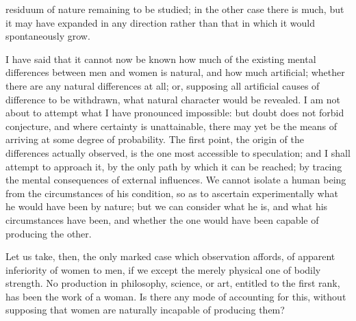 \documentclass[12pt]{report}
\begin{document}
residuum of nature remaining to be studied; in the other case there is much, but it may have expanded in any direction rather than that in which it would spontaneously grow.

I have said that it cannot now be known how much of the existing mental differences between men and women is natural, and how much artificial; whether there are any natural differences at all; or, supposing all artificial causes of difference to be withdrawn, what natural character would be revealed. I am not about to attempt what I have pronounced impossible: but doubt does not forbid conjecture, and where certainty is unattainable, there may yet be the means of arriving at some degree of probability. The first point, the origin of the differences actually observed, is the one most accessible to speculation; and I shall attempt to approach it, by the only path by which it can be reached; by tracing the mental consequences of external influences. We cannot isolate a human being from the circumstances of his condition, so as to ascertain experimentally what he would have been by nature; but we can consider what he is, and what his circumstances have been, and whether the one would have been capable of producing the other.

Let us take, then, the only marked case which observation affords, of apparent inferiority of women to men, if we except the merely physical one of bodily strength. No production in philosophy, science, or art, entitled to the first rank, has been the work of a woman. Is there any mode of accounting for this, without supposing that women are naturally incapable of producing them?
\end{document}
